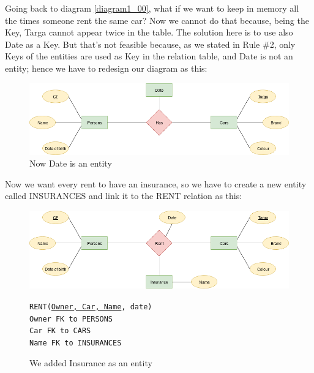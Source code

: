 \documentclass[class=book, crop=false, oneside]{standalone}
\newcommand\tab[1][1cm]{\hspace*{#1}}
\begin{document}
Going back to diagram \ref{diagram1_00}, what if we want to keep in memory all the times someone rent the same car?
Now we cannot do that because, being the Key, Targa cannot appear twice in the table.
The solution here is to use also Date as a Key.
But that's not feasible because, as we stated in Rule \#2, only Keys of the entities are used as Key in the relation table, and Date is not an entity; hence we have to redesign our diagram as this:
\begin{figure}[H]
	\includegraphics[width=\textwidth,keepaspectratio]{diagram1_03.png}
	\caption{Now Date is an entity}
	\label{diagram1_03}
\end{figure}
\vskip 20pt

Now we want every rent to have an insurance, so we have to create a new entity called INSURANCES and link it to the RENT relation as this:
\begin{figure}[H]
	\includegraphics[width=\textwidth,keepaspectratio]{diagram1_04.png}
	\caption{We added Insurance as an entity}
	\texttt{RENT(\underline{Owner, Car, Name}, date)}\\
		\tab[.8cm] \texttt{Owner FK to PERSONS}\\
		\tab[.8cm] \texttt{Car FK to CARS}\\
		\tab[.8cm] \texttt{Name FK to INSURANCES}
	\label{diagram1_04}
\end{figure}
\vskip 20pt
\end{document}

